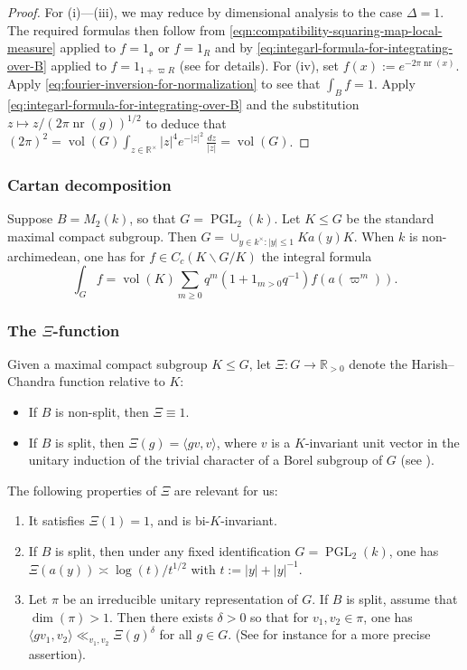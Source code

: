 \documentclass[reqno,10pt]{amsart}
\theoremstyle{plain} %
\theoremstyle{definition}
\theoremstyle{plain} %
\theoremstyle{remark}
\theoremstyle{itplain} %
\theoremstyle{remark} %
\renewcommand{\geq}{\geqslant}
\renewcommand{\leq}{\leqslant}
\numberwithin{equation}{section}
\def\PGL{\operatorname{PGL}}
\DeclareMathOperator{\vol}{vol}
\DeclareMathOperator{\nr}{nr}
\begin{document}
\begin{proof}
  For (i)---(iii), we may reduce by dimensional analysis to the case $\Delta = 1$.  The required formulas then follow from \eqref{eqn:compatibility-squaring-map-local-measure} applied to $f = 1_\mathfrak{o}$ or $f = 1_R$ and by \eqref{eq:integarl-formula-for-integrating-over-B} applied to $f = 1_{1 + \varpi R}$ (see \cite[Lem 2.4.3]{MR580949} for details).  For (iv), set $f(x) := e^{- 2 \pi \nr(x)}$. Apply \eqref{eq:fourier-inversion-for-normalization} to see that $\int_B f = 1$.  Apply \eqref{eq:integarl-formula-for-integrating-over-B} and the substitution $z \mapsto z / (2 \pi \nr(g))^{1/2}$ to deduce that $(2 \pi)^2 = \vol(G) \int_{z \in \mathbb{R}^\times} |z|^4 e^{-|z|^2} \, \frac{d z}{|z|} = \vol(G)$.
\end{proof}


\subsubsection{Cartan
  decomposition}\label{sec:cartan-decomposition}
Suppose $B = M_2(k)$, so that $G = \PGL_2(k)$.  Let $K \leq G$ be the standard maximal compact subgroup.  Then $G = \cup_{y \in k^\times : |y| \leq 1} K a(y) K$.  When $k$ is non-archimedean, one has
for $f \in C_c(K \backslash G / K)$ the integral formula
\begin{equation}\label{eq:cartan-decomp-integral-formula}
  \int_{G}
  f
  =
  \vol(K)
  \sum_{m \geq 0}
  q^m
  (1 + 1_{m > 0} q^{-1})
  f(a(\varpi^m)).
\end{equation}


\subsubsection{The $\Xi$-function\label{sec:local-Xi}}
\label{sec-2-1-4}
Given a maximal compact subgroup $K \leq G$, let $\Xi : G \rightarrow \mathbb{R}_{>0}$ denote the Harish--Chandra function relative to $K$:
\begin{itemize}
\item If $B$ is non-split, then $\Xi \equiv 1$.
\item If $B$ is split, then $\Xi(g) = \langle g v, v \rangle$, where $v$ is a $K$-invariant unit vector in the unitary induction of the trivial character of a Borel subgroup of $G$ (see \cite{MR946351}).
\end{itemize}
The following properties of $\Xi$ are relevant for us:
\begin{enumerate}
\item It satisfies $\Xi(1) = 1$, and is bi-$K$-invariant.
\item If $B$ is split, then under any fixed identification $G = \PGL_2(k)$, one has $\Xi(a(y)) \asymp \log(t)/t^{1/2}$ with $t := |y| + |y|^{-1}$.
\item Let $\pi$ be an irreducible unitary representation of $G$.  If $B$ is split, assume that $\dim(\pi) > 1$.  Then there exists $\delta > 0$ so that for $v_1, v_2 \in \pi$, one has $\langle g v_1, v_2 \rangle \ll_{v_1,v_2} \Xi(g)^{\delta}$ for all $g \in G$.  (See for instance \cite[\S2.5.1]{michel-2009} for a more precise assertion).
\end{enumerate}
\end{document}
